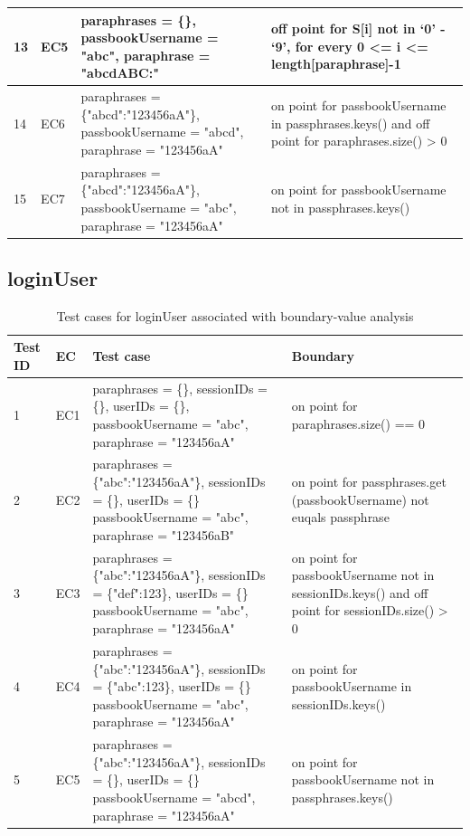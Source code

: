 \documentclass{article}
\begin{document}
\begin{longtable}{|p{0.5cm}|p{0.5cm}|p{7cm}|p{5cm}|}
\hline
13&EC5&paraphrases = \{\}, passbookUsername = "abc", paraphrase = "abcdABC:"&off point for S[i] not in ‘0’ - ‘9’, for every 0 <= i <= length[paraphrase]-1\\
\hline
14&EC6&paraphrases = \{"abcd":"123456aA"\}, passbookUsername = "abcd", paraphrase = "123456aA"&on point for passbookUsername in passphrases.keys() and off point for paraphrases.size() > 0\\
\hline
15&EC7&paraphrases = \{"abcd":"123456aA"\}, passbookUsername = "abc", paraphrase = "123456aA"&on point for passbookUsername not in passphrases.keys()\\
\hline
\end{longtable}

\subsection{loginUser}

\begin{longtable}{|p{0.5cm}|p{0.5cm}|p{7cm}|p{5cm}|}
\caption{Test cases for loginUser associated with boundary-value analysis}\\
\hline 
Test ID&EC&Test case&Boundary\\
\hline  
1&EC1&paraphrases = \{\}, sessionIDs = \{\}, userIDs = \{\}, passbookUsername = "abc", paraphrase = "123456aA"&on point for paraphrases.size() == 0\\
\hline
2&EC2&paraphrases = \{"abc":"123456aA"\}, sessionIDs = \{\}, userIDs = \{\} passbookUsername = "abc", paraphrase = "123456aB"&on point for passphrases.get (passbookUsername)
not euqals passphrase\\
\hline
3&EC3&paraphrases = \{"abc":"123456aA"\}, sessionIDs = \{"def":123\}, userIDs = \{\} passbookUsername = "abc", paraphrase = "123456aA"&on point for passbookUsername not in sessionIDs.keys() and off point for sessionIDs.size() > 0\\
\hline
4&EC4&paraphrases = \{"abc":"123456aA"\}, sessionIDs = \{"abc":123\}, userIDs = \{\} passbookUsername = "abc", paraphrase = "123456aA"&on point for passbookUsername in sessionIDs.keys()\\
\hline
5&EC5&paraphrases = \{"abc":"123456aA"\}, sessionIDs = \{\}, userIDs = \{\} passbookUsername = "abcd", paraphrase = "123456aA"&on point for passbookUsername not in passphrases.keys()\\
\hline
\end{longtable}
\end{document}
